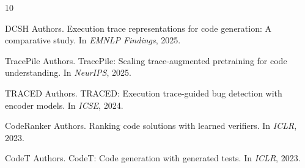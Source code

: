 \documentclass[11pt,a4paper]{article}
\begin{document}
\begin{thebibliography}{10}

DCSH Authors.
\newblock Execution trace representations for code generation: A comparative study.
\newblock In \emph{EMNLP Findings}, 2025.

TracePile Authors.
\newblock TracePile: Scaling trace-augmented pretraining for code understanding.
\newblock In \emph{NeurIPS}, 2025.

TRACED Authors.
\newblock TRACED: Execution trace-guided bug detection with encoder models.
\newblock In \emph{ICSE}, 2024.

CodeRanker Authors.
\newblock Ranking code solutions with learned verifiers.
\newblock In \emph{ICLR}, 2023.

CodeT Authors.
\newblock CodeT: Code generation with generated tests.
\newblock In \emph{ICLR}, 2023.

\end{thebibliography}
\end{document}
